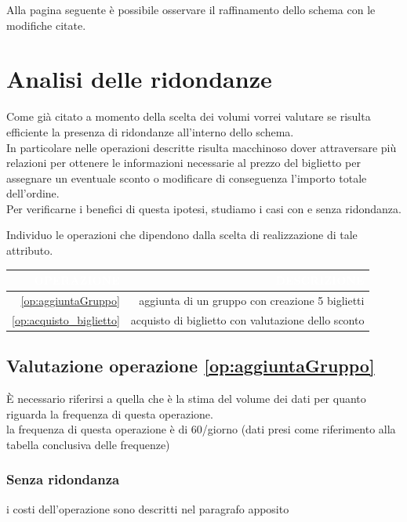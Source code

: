 \documentclass[a4paper,12pt]{report}
\begin{document}
Alla pagina seguente è possibile osservare il raffinamento dello schema con le modifiche citate.


\section{Analisi delle ridondanze}
Come già citato a momento\- della scelta dei volumi vorrei\- valutare se risulta
efficiente la presenza di ridondanze all'interno dello schema.\\ In particolare
nelle operazioni descritte risulta macchinoso dover attraversare più relazioni
per ottenere le informazioni necessarie al prezzo del biglietto per assegnare
un eventuale sconto o modificare di conseguenza l'importo totale dell'ordine.\\
Per verificarne i benefici di questa ipotesi, studiamo i casi con e senza ridondanza.

Individuo le operazioni che dipendono dalla scelta di realizzazione di tale attributo.
\begin{table}[H]
	\centering
	\begin{tabularx}{\textwidth}{|D|D|}
		\hline
		\textcolor{white}{OPERAZIONE} & \color{white}\textcolor{white}{DESCRIZIONE}        \\
		\hline
		\ref{op:aggiuntaGruppo}                     & aggiunta di un gruppo con creazione 5 biglietti    \\
		\hline
		\ref{op:acquisto_biglietto}                 & acquisto di biglietto con valutazione dello sconto \\
		\hline
	\end{tabularx}
\end{table}
\subsection*{Valutazione operazione \ref{op:aggiuntaGruppo}}
È necessario riferirsi a quella che è la stima del volume dei dati per quanto
riguarda la frequenza di questa operazione.\\
la frequenza di questa operazione è di 60/giorno (dati presi come riferimento
alla tabella conclusiva delle frequenze)


\subsubsection*{Senza ridondanza}
i costi dell'operazione sono descritti nel paragrafo apposito
\end{document}
